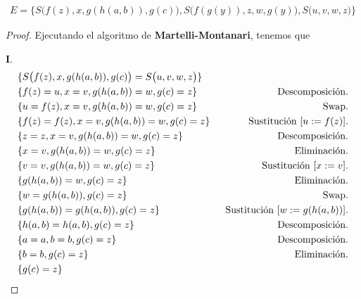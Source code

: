 \documentclass{article}
\begin{document}
\begin{eqnarray*}
  E = \{S\big(f(z), x, g(h(a, b)), g(c)\big), S\big(f(g(y)), z, w, g(y)\big), S\big(u, v, w, z\big)\}
\end{eqnarray*}
\begin{proof} Ejecutando el algoritmo de \textbf{Martelli-Montanari}, tenemos que

  \textbf{I}.
  \begin{eqnarray*}
    & \{S\big(f(z), x, g(h(a,b)), g(c)\big) = S\big(u, v, w, z\big)\} &\\
    & \{f(z) = u, x = v, g(h(a,b)) = w, g(c) = z\} &
    \hspace*{1cm} \text{Descomposición.}\\
    & \{u = f(z), x = v, g(h(a,b)) = w, g(c) = z\} &
    \hspace*{1.8cm} \text{Swap.}\\
    & \{f(z) = f(z), x = v, g(h(a,b)) = w, g(c) = z\} &
    \hspace*{0.6cm} \text{Sustitución } [u := f(z)].\\
    & \{z = z, x = v, g(h(a,b)) = w, g(c) = z\} &
    \hspace*{1.1cm} \text{Descomposición.}\\
    & \{x = v, g(h(a,b)) = w, g(c) = z\} &
    \hspace*{1.45cm} \text{Eliminación.}\\
    & \{v = v, g(h(a,b)) = w, g(c) = z\} &
    \hspace*{0.8cm} \text{Sustitución } [x := v].\\
    & \{g(h(a,b)) = w, g(c) = z\} &
    \hspace*{1.45cm} \text{Eliminación.}\\
    & \{w = g(h(a,b)), g(c) = z\} &
    \hspace*{1.95cm} \text{Swap.}\\
    & \{g(h(a,b)) = g(h(a,b)), g(c) = z\} &
    \hspace*{0.2cm} \text{Sustitución } [w := g(h(a, b))].\\
    & \{h(a,b) = h(a,b), g(c) = z\} &
    \hspace*{1.2cm} \text{Descomposición.}\\
    & \{a = a, b = b, g(c) = z\} &
    \hspace*{1.2cm} \text{Descomposición.}\\
    & \{b = b, g(c) = z\} &
    \hspace*{1.45cm} \text{Eliminación.}\\
    & \{g(c) = z\} &

\end{eqnarray*}
\end{proof}
\end{document}
